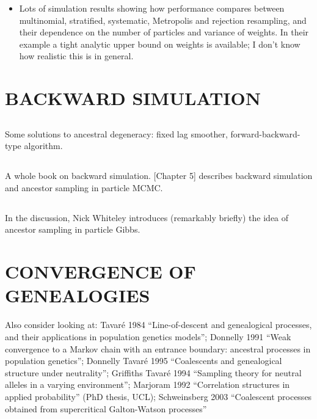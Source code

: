 \documentclass{article}
\begin{document}
\begin{itemize}
\item Lots of simulation results showing how performance compares between multinomial, stratified, systematic, Metropolis and rejection resampling, and their dependence on the number of particles and variance of weights. In their example a tight analytic upper bound on weights is available; I don't know how realistic this is in general.
\end{itemize}


\subsection*{\cite{lee2016}}



%
\section*{BACKWARD SIMULATION}

\subsection*{\cite{kitagawa1996}}
Some solutions to ancestral degeneracy: fixed lag smoother, forward-backward-type algorithm.

\subsection*{\cite{doucet2009}}


\subsection*{\cite{lindsten2013}}
A whole book on backward simulation. [Chapter 5] describes backward simulation and ancestor sampling in particle MCMC.

\subsection*{\cite{whiteley2010}}
In the discussion, Nick Whiteley introduces (remarkably briefly) the idea of ancestor sampling in particle Gibbs.





\section*{CONVERGENCE OF GENEALOGIES}

Also consider looking at: 
Tavar\'e 1984 ``Line-of-descent and genealogical processes, and their applications in population genetics models''; 
Donnelly 1991 ``Weak convergence to  a Markov chain with an entrance boundary: ancestral processes in population genetics''; 
Donnelly Tavar\'e 1995 ``Coalescents and genealogical structure under neutrality''; 
Griffiths Tavar\'e 1994 ``Sampling theory for neutral alleles in a varying environment''; 
Marjoram 1992 ``Correlation structures in applied probability'' (PhD thesis, UCL);
Schweinsberg 2003 ``Coalescent processes obtained from supercritical Galton-Watson processes''
\end{document}
